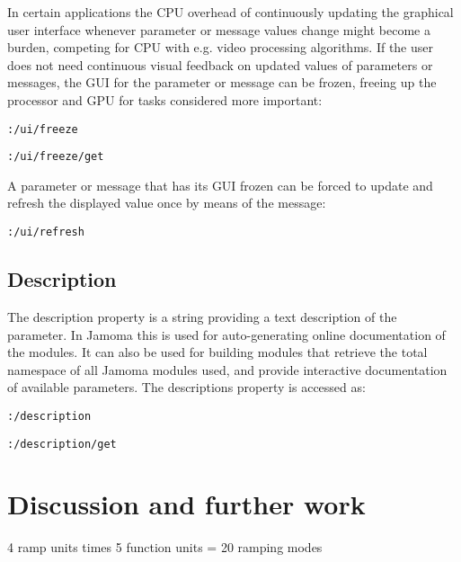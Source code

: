 \documentclass{NIME-alternate}
\begin{document}
In certain applications the CPU overhead of continuously updating the graphical user interface whenever parameter or message values change might become a burden, competing for CPU with e.g. video processing algorithms. If the user does not need continuous visual feedback on updated values of parameters or messages, the GUI for the parameter or message can be frozen, freeing up the processor and GPU for tasks considered more important:

\texttt{:/ui/freeze}

\texttt{:/ui/freeze/get}

A parameter or message that has its GUI frozen can be forced to update and refresh the displayed value once by means of the message:

\texttt{:/ui/refresh}






\subsection{Description} %
\label{sub:description}

The description property is a string providing a text description of the parameter. In Jamoma this is used for auto-generating online documentation of the modules. It can also be used for building modules that retrieve the total namespace of all Jamoma modules used, and provide interactive documentation of available parameters. The descriptions property is accessed as:

\texttt{:/description}

\texttt{:/description/get}







\section{Discussion and further work} %
\label{sec:discussion_and_further_work}   

4 ramp units times 5 function units = 20 ramping modes
\end{document}
